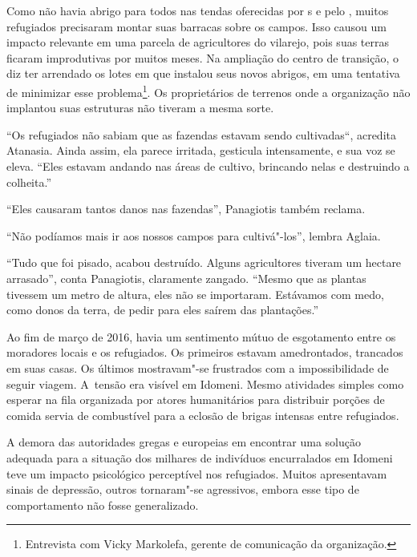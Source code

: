 Como não havia abrigo para todos nas tendas oferecidas por s e pelo  ,
muitos refugiados precisaram montar suas barracas sobre os campos. Isso
causou um impacto relevante em uma parcela de agricultores do vilarejo,
pois suas terras ficaram improdutivas por muitos meses. Na ampliação
do centro de transição, o  diz ter arrendado os lotes em que instalou
seus novos abrigos, em uma tentativa de minimizar esse
problema\footnote{ Entrevista com Vicky Markolefa, gerente de
comunicação da organização.}. Os proprietários de terrenos onde a organização
não implantou suas estruturas não tiveram a mesma sorte.

``Os refugiados não sabiam que as fazendas estavam sendo cultivadas``,
acredita Atanasia. Ainda assim, ela parece irritada, gesticula
intensamente, e sua voz se eleva. ``Eles estavam andando nas áreas de
cultivo, brincando nelas e destruindo a colheita.''

``Eles causaram tantos danos nas fazendas'', Panagiotis também reclama.

``Não podíamos mais ir aos nossos campos para cultivá"-los'', lembra
Aglaia.

``Tudo que foi pisado, acabou destruído. Alguns agricultores tiveram um
hectare arrasado'', conta Panagiotis, claramente zangado. ``Mesmo que
as plantas tivessem um metro de altura, eles não se importaram.
Estávamos com medo, como donos da terra, de pedir para eles saírem das
plantações.''


Ao fim de março de 2016, havia um sentimento mútuo de esgotamento entre os
moradores locais e os refugiados. Os primeiros estavam amedrontados,
trancados em suas casas. Os últimos mostravam"-se frustrados com a
impossibilidade de seguir viagem. A~tensão era visível em Idomeni. Mesmo
atividades simples como esperar na fila organizada por atores
humanitários para distribuir porções de comida servia de combustível
para a eclosão de brigas intensas entre refugiados.

A demora das autoridades gregas e europeias em encontrar uma solução
adequada para a situação dos milhares de indivíduos encurralados em
Idomeni teve um impacto psicológico perceptível nos refugiados. Muitos
apresentavam sinais de depressão, outros tornaram"-se agressivos, embora
esse tipo de comportamento não fosse generalizado.

